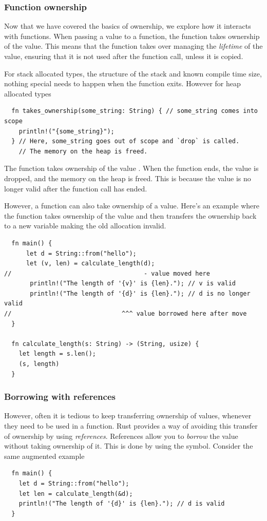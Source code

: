\documentclass[11pt]{report}
\theoremstyle{definition}
\theoremstyle{plain}
\begin{document}
\subsubsection{Function ownership}\label{sub:rustlifetimes}
Now that we have covered the basics of ownership, we explore how it interacts with functions. When passing a value to a function, the function takes ownership of the value. This means that the function takes over managing the \textit{lifetime} of the value, ensuring that it is not used after the function call, unless it is copied.

For stack allocated types, the structure of the stack and known compile time size, nothing special needs to happen when the function exits. However for heap allocated types
\begin{verbatim}
  fn takes_ownership(some_string: String) { // some_string comes into scope
    println!("{some_string}");
  } // Here, some_string goes out of scope and `drop` is called.
    // The memory on the heap is freed.
\end{verbatim}

The function takes ownership of the  value . When the function ends, the  value is dropped, and the memory on the heap is freed. This is because the value is no longer valid after the function call has ended.

However, a function can also take ownership of a value. Here's an example where the function takes ownership of the value and then transfers the ownership back to a new variable  making the old allocation invalid.
\begin{verbatim}
  fn main() {
      let d = String::from("hello");
      let (v, len) = calculate_length(d);
//                                    - value moved here
       println!("The length of '{v}' is {len}."); // v is valid
       println!("The length of '{d}' is {len}."); // d is no longer valid
//                              ^^^ value borrowed here after move
  }

  fn calculate_length(s: String) -> (String, usize) {
    let length = s.len();
    (s, length)
  }
\end{verbatim}

\subsubsection{Borrowing with references}
However, often it is tedious to keep transferring ownership of values, whenever they need to be used in a function. Rust provides a way of avoiding this transfer of ownership by using \textit{references}. References allow you to \textit{borrow} the value without taking ownership of it. This is done by using the \rust{&} symbol. Consider the same augmented example
\begin{verbatim}
  fn main() {
    let d = String::from("hello");
    let len = calculate_length(&d);
    println!("The length of '{d}' is {len}."); // d is valid
  }
\end{verbatim}
\end{document}
